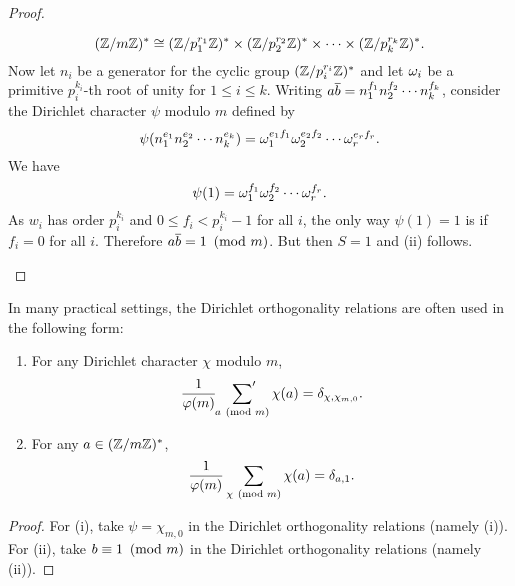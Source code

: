 \begin{proof}
\begin{enumerate}[label=(\roman*)]
        \[
          (\mathbb{Z}/m\mathbb{Z})^{\ast} \cong (\mathbb{Z}/p_{1}^{r_{1}}\mathbb{Z})^{\ast} \times (\mathbb{Z}/p_{2}^{r_{2}}\mathbb{Z})^{\ast} \times \cdots \times (\mathbb{Z}/p_{k}^{r_{k}}\mathbb{Z})^{\ast}.
        \]
        Now let $n_{i}$ be a generator for the cyclic group $(\mathbb{Z}/p_{i}^{r_{i}}\mathbb{Z})^{\ast}$ and let $\omega_{i}$ be a primitive $p_{i}^{k_{i}}$-th root of unity for $1 \le i \le k$. Writing $a\overline{b} = n_{1}^{f_{1}}n_{2}^{f_{2}} \cdots n_{k}^{f_{k}}$, consider the Dirichlet character $\psi$ modulo $m$ defined by
        \[
          \psi(n_{1}^{e_{1}}n_{2}^{e_{2}} \cdots n_{k}^{e_{k}}) = \omega_{1}^{e_{1}f_{1}}\omega_{2}^{e_{2}f_{2}} \cdots \omega_{r}^{e_{r}f_{r}}.
        \]
        We have
        \[
          \psi(1) = \omega_{1}^{f_{1}}\omega_{2}^{f_{2}} \cdots \omega_{r}^{f_{r}}.
        \]
        As $w_{i}$ has order $p_{i}^{k_{i}}$ and $0 \le f_{i} < p_{i}^{k_{i}}-1$ for all $i$, the only way $\psi(1) = 1$ is if $f_{i} = 0$ for all $i$. Therefore $a\overline{b} = 1 \ \left(\text{mod }m\right)$. But then $S = 1$ and (ii) follows.
      \end{enumerate}
    \end{proof}

    In many practical settings, the Dirichlet orthogonality relations are often used in the following form:

    \begin{corollary}\label{cor:Dirichlet_orthogonality_relations}
    \phantom{ }
      \begin{enumerate}[label=(\roman*)]
        \item For any Dirichlet character $\chi$ modulo $m$,
        \[
          \frac{1}{\varphi(m)}\sideset{}{'}\sum_{a \ \left(\text{mod }m\right)}\chi(a) = \delta_{\chi,\chi_{m,0}}.
        \]
        \item For any $a \in (\mathbb{Z}/m\mathbb{Z})^{\ast}$,
        \[
          \frac{1}{\varphi(m)}\sum_{\chi \ \left(\text{mod }m\right)}\chi(a) = \delta_{a,1}.
        \]
      \end{enumerate}
    \end{corollary}
    \begin{proof}
      For (i), take $\psi = \chi_{m,0}$ in the Dirichlet orthogonality relations (namely (i)). For (ii), take $b \equiv 1 \ \left(\text{mod }m\right)$ in the Dirichlet orthogonality relations (namely (ii)).
    \end{proof}

